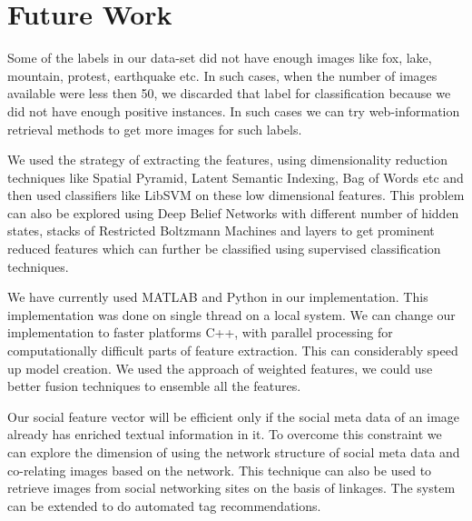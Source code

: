 \section{Future Work}
Some of the labels in our data-set did not have enough images like 
fox, lake, mountain, protest, earthquake etc. In such cases, when the 
number of images available were less then 50, we discarded that 
label for classification because we did not have enough positive 
instances. In such cases we can try web-information retrieval 
methods to get more images for such labels.

We used the strategy of extracting the features, using 
dimensionality reduction techniques like Spatial Pyramid, Latent 
Semantic Indexing, Bag of Words etc  and then used classifiers 
like LibSVM on these low dimensional features.
This problem can also be explored using Deep Belief Networks 
\citep{dbn} with different number of hidden states, stacks of 
Restricted Boltzmann Machines and layers to get prominent reduced 
features which can further be classified using supervised 
classification techniques.

We have currently used MATLAB and Python in our implementation.
This implementation was done on single thread on a local system. We 
can change our implementation to faster platforms C++, 
with parallel processing for computationally difficult parts of 
feature extraction. This can considerably speed up model creation. 
We used the approach of weighted features, we 
could use better fusion techniques to ensemble all the features.

Our social feature vector will be efficient only if the social meta 
data of an image already has enriched textual information in it. To 
overcome this constraint we can explore the dimension of using the 
network structure of social meta data and co-relating images based
on the network. This technique can also be used to 
retrieve images from social networking sites on the basis of 
linkages. The system can be extended to do automated tag recommendations. 
